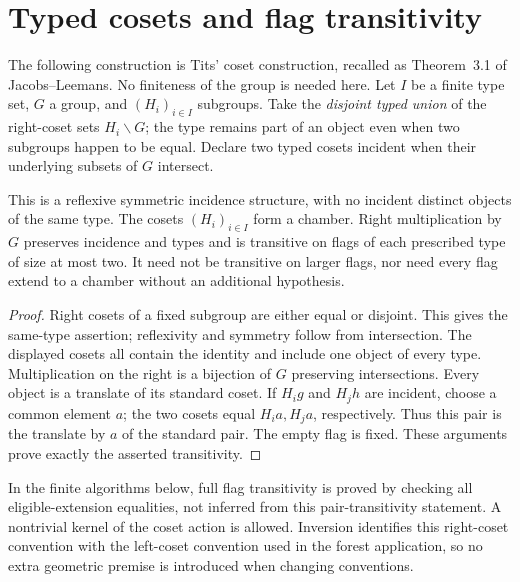 \section{Typed cosets and flag transitivity}
The following construction is Tits' coset construction, recalled as
Theorem~3.1 of Jacobs--Leemans. No finiteness of the group is needed here.
Let $I$ be a finite type set, $G$ a group, and $(H_i)_{i\in I}$ subgroups.
Take the \emph{disjoint typed union} of the right-coset sets
$H_i\backslash G$; the type remains part of an object even when two
subgroups happen to be equal. Declare two typed cosets incident when
their underlying subsets of $G$ intersect.

\begin{proposition}\label{tits}
This is a reflexive symmetric incidence structure, with no incident
distinct objects of the same type. The cosets $(H_i)_{i\in I}$ form a
chamber. Right multiplication by $G$ preserves incidence and types and
is transitive on flags of each prescribed type of size at most two.
It need not be transitive on larger flags, nor need every flag extend
to a chamber without an additional hypothesis.
\end{proposition}
\begin{proof}
Right cosets of a fixed subgroup are either equal or disjoint. This
gives the same-type assertion; reflexivity and symmetry follow from
intersection. The displayed cosets all contain the identity and include
one object of every type. Multiplication on the right is a bijection
of $G$ preserving intersections. Every object is a translate of its
standard coset. If $H_i g$ and $H_j h$ are incident, choose a common
element $a$; the two cosets equal $H_i a,H_j a$, respectively. Thus this
pair is the translate by $a$ of the standard pair. The empty flag is
fixed. These arguments prove exactly the asserted transitivity.
\end{proof}

In the finite algorithms below, full flag transitivity is proved by
checking all eligible-extension equalities, not inferred from this
pair-transitivity statement. A nontrivial kernel of the coset action
is allowed. Inversion identifies this right-coset convention with the
left-coset convention used in the forest application, so no extra
geometric premise is introduced when changing conventions.
